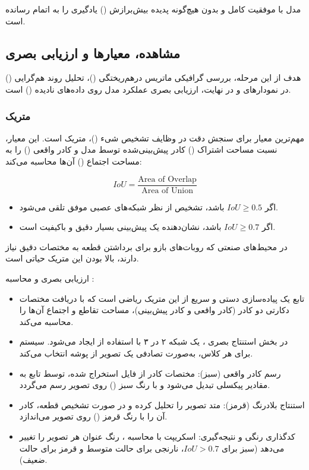 \documentclass{article}
\begin{document}
مدل  با موفقیت کامل و بدون هیچ‌گونه پدیده بیش‌برازش () یادگیری را به اتمام رسانده است.
\subsection{مشاهده، معیارها و ارزیابی بصری}

هدف از این مرحله، بررسی گرافیکی ماتریس درهم‌ریختگی ()، تحلیل روند هم‌گرایی () در نمودارهای  و در نهایت، ارزیابی بصری عملکرد مدل روی داده‌های نادیده () است.

\subsubsection{متریک }

مهم‌ترین معیار برای سنجش دقت در وظایف تشخیص شیء ()، متریک  است. این معیار، نسبت مساحت اشتراک () کادر پیش‌بینی‌شده توسط مدل و کادر واقعی () را به مساحت اجتماع () آن‌ها محاسبه می‌کند:

$$IoU = \frac{\text{Area of Overlap}}{\text{Area of Union}}$$

\begin{itemize}
	\item اگر $IoU \ge 0.5$ باشد، تشخیص از نظر شبکه‌های عصبی موفق تلقی می‌شود.
	\item اگر $IoU \ge 0.7$ باشد، نشان‌دهنده یک پیش‌بینی بسیار دقیق و باکیفیت است.
\end{itemize}

در محیط‌های صنعتی که روبات‌های بازو برای برداشتن قطعه به مختصات دقیق نیاز دارند، بالا بودن این متریک حیاتی است.

ارزیابی بصری و محاسبه :
	\begin{itemize}
		\item تابع  یک پیاده‌سازی دستی و سریع از این متریک ریاضی است که با دریافت مختصات دکارتی دو کادر (کادر واقعی و کادر پیش‌بینی)، مساحت تقاطع و اجتماع آن‌ها را محاسبه می‌کند.
		\item در بخش استنتاج بصری ، یک شبکه ۲ در ۳ با استفاده از  ایجاد می‌شود. سیستم برای هر کلاس، به‌صورت تصادفی یک تصویر از پوشه  انتخاب می‌کند.
		\item رسم کادر واقعی (سبز): مختصات کادر از فایل  استخراج شده، توسط تابع  به مقادیر پیکسلی تبدیل می‌شود و با رنگ سبز () روی تصویر رسم می‌گردد.
		\item استنتاج بلادرنگ (قرمز): متد  تصویر را تحلیل کرده و در صورت تشخیص قطعه، کادر آن را با رنگ قرمز () روی تصویر می‌اندازد.
		\item کدگذاری رنگی و نتیجه‌گیری: اسکریپت با محاسبه ، رنگ عنوان هر تصویر را تغییر می‌دهد (سبز برای $IoU > 0.7$، نارنجی برای حالت متوسط و قرمز برای حالت ضعیف).
	\end{itemize}
\end{document}

